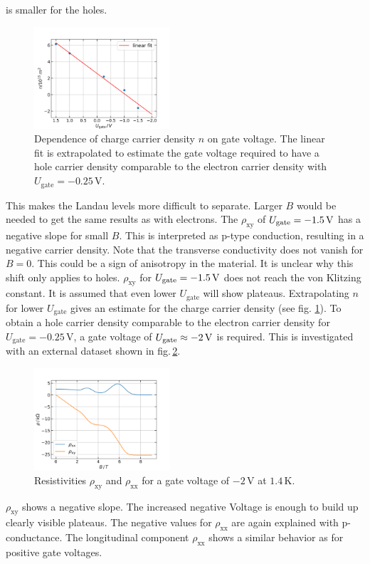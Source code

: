 is smaller for the holes.
\begin{figure}[h]
    \centering
    \includegraphics[width=0.45\textwidth]{../Images/extrapolatingN.png}
    \caption{
        Dependence of charge carrier density $n$ on gate voltage.
        The linear fit is extrapolated to estimate the gate voltage required to have a hole carrier density comparable to the electron carrier density with $U_\text{gate} = -0.25\,\text{V}$.}
    \label{fig:extrapolating}
\end{figure}
This makes the Landau levels more difficult to separate. 
Larger $B$ would be needed to get the same results as with electrons.
The $\rho_\text{xy}$ of $U_\text{gate} = -1.5\,\text V$ has a negative slope for small $B$.
This is interpreted as p-type conduction, resulting in a negative carrier density.
Note that the transverse conductivity does not vanish for $B=0$.
This could be a sign of anisotropy in the material.
It is unclear why this shift only applies to holes.
$\rho_\text{xy}$ for $U_\text{gate} = -1.5 \,\text V$ does not reach the von Klitzing constant.
It is assumed that even lower $U_\text{gate}$ will show plateaus.
Extrapolating $n$ for lower $U_\text{gate}$ gives an estimate for the charge carrier density (see fig. \ref{fig:extrapolating}).
To obtain a hole carrier density comparable to the electron carrier density for $U_\text{gate} = -0.25\,\text{V}$,
a gate voltage of $U_\text{gate} \approx -2\,\text V$ is required.
This is investigated with an external dataset shown in fig.\,\ref{fig.externalDataset}.
\begin{figure}[h]
    \centering
    \includegraphics[width=0.45\textwidth]{../Images/neuerDatensatz.png}
    \caption{Resistivities $\rho_\text{xy}$ and $\rho_\text{xx}$ for a gate voltage of $-2\,\text{V}$ at $1.4\,\text{K}$.
    }
    \label{fig.externalDataset}
\end{figure}
$\rho_\text{xy}$ shows a negative slope. 
The increased negative Voltage is enough to build up clearly visible plateaus. 
The negative values for $\rho_\text{xx}$ are again explained with p-conductance.
The longitudinal component $\rho_\text{xx}$ shows a similar behavior as for positive gate voltages.